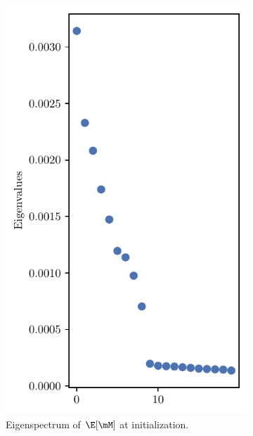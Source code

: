 \begin{figure}[h]
    \centering
    \begin{subfigure}[b]{0.2\textwidth}
        \centering
        \captionsetup{justification=centering}
        \includegraphics[width=\textwidth]{Appendix_Figures/TSNE_M/new/spec_0.pdf}
        \caption{Eigenspectrum of $\E[\mM]$ at initialization.}
        \label{fig:app_tsne_h_init}
    \end{subfigure}%
    \begin{subfigure}[b]{0.4\textwidth}
        \centering
        \captionsetup{justification=centering}

\end{subfigure}
\end{figure}
